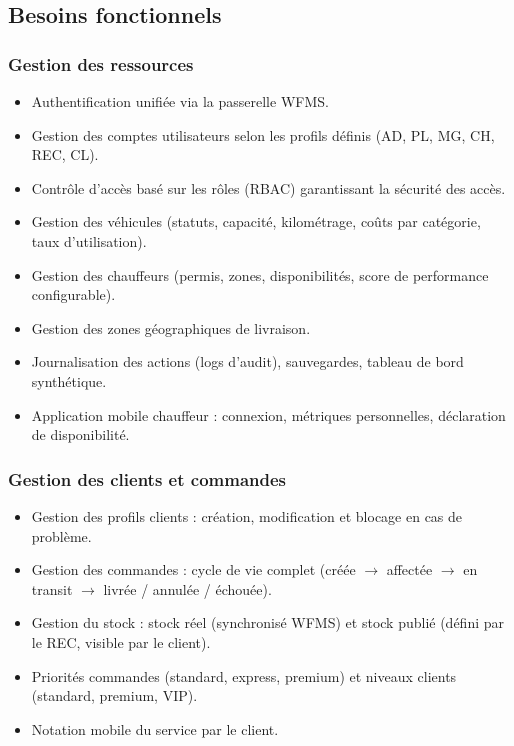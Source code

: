 \subsection{Besoins fonctionnels}

\subsubsection{Gestion des ressources}
\begin{itemize}[leftmargin=2.5em]
    \item[$\bullet$] Authentification unifiée via la passerelle WFMS.
    \item[$\bullet$] Gestion des comptes utilisateurs selon les profils définis (AD, PL, MG, CH, REC, CL).
    \item[$\bullet$] Contrôle d'accès basé sur les rôles (RBAC) garantissant la sécurité des accès.
    \item[$\bullet$] Gestion des véhicules (statuts, capacité, kilométrage, coûts par catégorie, taux d'utilisation).
    \item[$\bullet$] Gestion des chauffeurs (permis, zones, disponibilités, score de performance configurable).
    \item[$\bullet$] Gestion des zones géographiques de livraison.
    \item[$\bullet$] Journalisation des actions (logs d'audit), sauvegardes, tableau de bord synthétique.
    \item[$\bullet$] Application mobile chauffeur : connexion, métriques personnelles, déclaration de disponibilité.
\end{itemize}

\subsubsection{Gestion des clients et commandes}
\begin{itemize}[leftmargin=2.5em]
    \item[$\bullet$] Gestion des profils clients : création, modification et blocage en cas de problème.
    \item[$\bullet$] Gestion des commandes : cycle de vie complet (créée $\to$ affectée $\to$ en transit $\to$ livrée / annulée / échouée).
    \item[$\bullet$] Gestion du stock : stock réel (synchronisé WFMS) et stock publié (défini par le REC, visible par le client).
    \item[$\bullet$] Priorités commandes (standard, express, premium) et niveaux clients (standard, premium, VIP).
    \item[$\bullet$] Notation mobile du service par le client.
\end{itemize}

